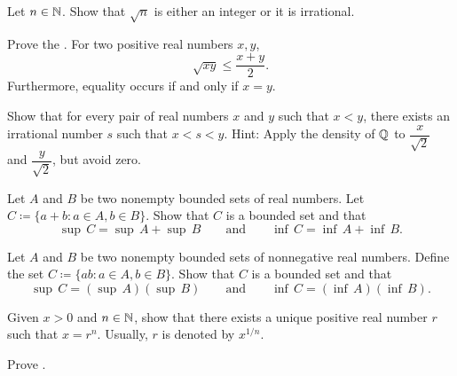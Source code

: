 \begin{exercise}
Let $n \in {\mathbb{N}}$.
Show that $\sqrt{n}$ is either an integer or it is
irrational.
\end{exercise}

\begin{exercise}
Prove the \emph{}.
For two positive real numbers $x,y$,
\begin{equation*}
\sqrt{xy} \leq \frac{x+y}{2} .
\end{equation*}
Furthermore, equality occurs if and only if $x=y$.
\end{exercise}

\begin{exercise}
Show that for every pair of real numbers $x$ and $y$ such that $x < y$, there
exists an irrational number $s$ such that $x < s < y$.  Hint:
Apply the density of ${\mathbb{Q}}$ to $\dfrac{x}{\sqrt{2}}$ and
$\dfrac{y}{\sqrt{2}}$, but avoid zero.
\end{exercise}

\begin{exercise} \label{exercise:supofsum}
Let $A$ and $B$ be two nonempty bounded sets of real numbers.  Let
$C \coloneqq \{ a+b : a \in A, b \in B \}$.
Show that $C$ is a bounded set and that
\begin{equation*}
\sup\,C = \sup\,A + \sup\,B
\qquad \text{and} \qquad
\inf\,C = \inf\,A + \inf\,B .
\end{equation*}
\end{exercise}

\begin{exercise}
Let $A$ and $B$ be two nonempty bounded sets of nonnegative real numbers.
Define the set
$C \coloneqq \{ ab : a \in A, b \in B \}$.
Show that $C$ is a bounded set and that
\begin{equation*}
\sup\,C = (\sup\,A )( \sup\,B)
\qquad \text{and} \qquad
\inf\,C = (\inf\,A )( \inf\,B).
\end{equation*}
\end{exercise}

\begin{exercise}[Hard] \label{exercise:rootexistshard}
Given $x > 0$ and $n \in {\mathbb{N}}$, show that there exists a unique positive
real number $r$ such that $x = r^n$.  Usually, $r$ is denoted by $x^{1/n}$.
\end{exercise}

\begin{exercise}[Easy]
Prove .
\end{exercise}

